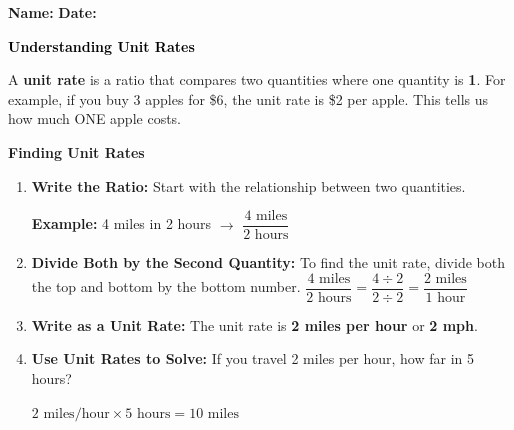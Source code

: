 \documentclass[12pt, letterpaper, fleqn]{article}
\begin{document}
\textbf{Name:} \underline{\hspace{5cm}}
\hfill
\textbf{Date:} \underline{\hspace{3cm}}\\

\begin{tcolorbox}[colback=customteal!20]
    \large\textcolor{black}{\textbf{Understanding Unit Rates}}
\end{tcolorbox}

\vspace{4mm}

\noindent
A \textbf{unit rate} is a ratio that compares two quantities where one quantity is \textbf{1}. 
For example, if you buy 3 apples for \$6, the unit rate is \$2 per apple. This tells us how much ONE apple costs.

\vspace{4mm}

\begin{tcolorbox}[
    colback=white,
    colframe=black,
    boxrule=0.6pt,
    arc=4mm,
    left=6mm,
    right=6mm,
    top=5mm,
    bottom=5mm
]
\textbf{Finding Unit Rates}
\begin{enumerate}[leftmargin=8mm, itemsep=4mm]
    \item \textbf{Write the Ratio:} Start with the relationship between two quantities.
    
    \textbf{Example:} 4 miles in 2 hours $\rightarrow$ $\dfrac{4 \text{ miles}}{2 \text{ hours}}$
    \vspace{0.5cm}
    \item \textbf{Divide Both by the Second Quantity:} To find the unit rate, divide both the top and bottom by the bottom number.
    \vspace{0.5cm}
    $\dfrac{4 \text{ miles}}{2 \text{ hours}} = \dfrac{4 \div 2}{2 \div 2} = \dfrac{2 \text{ miles}}{1 \text{ hour}}$
    
    \item \textbf{Write as a Unit Rate:} The unit rate is \textbf{2 miles per hour} or \textbf{2 mph}.
    \vspace{0.5cm}
    \item \textbf{Use Unit Rates to Solve:} If you travel 2 miles per hour, how far in 5 hours?
    
    $2 \text{ miles/hour} \times 5 \text{ hours} = 10 \text{ miles}$
\end{enumerate}
\end{tcolorbox}
\end{document}
